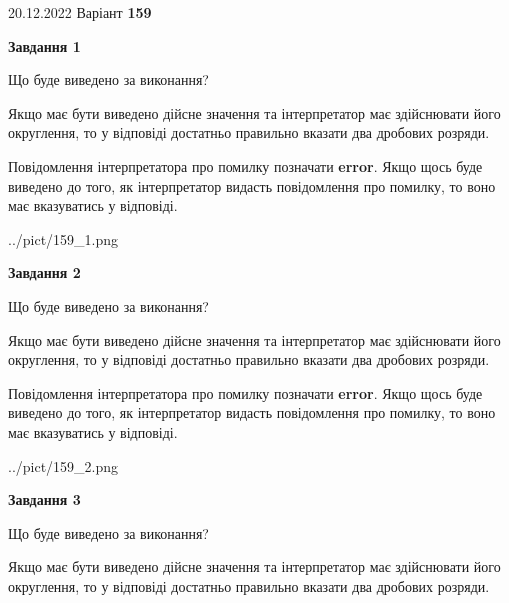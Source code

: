 \documentclass[12pt, ukrainian]{article}
\begin{document}
{20.12.2022 Варіант \No \textbf { 159 }\par}
{
\begin {Large}

{\begin {center}\textbf{Завдання 1}\end {center}}\par
Що буде виведено за виконання? \par

Якщо має бути виведено дійсне значення та інтерпретатор має здійснювати його округлення, 
то у відповіді достатньо правильно вказати два дробових розряди.

Повідомлення інтерпретатора про помилку позначати \textbf{error}.
Якщо щось буде виведено до того, як інтерпретатор видасть повідомлення про помилку, 
то воно має вказуватись у відповіді. \par

\begin{center}
	{../pict/159_1.png}
\end{center}
\newpage

{\begin {center}\textbf{Завдання 2}\end {center}}\par
Що буде виведено за виконання? \par

Якщо має бути виведено дійсне значення та інтерпретатор має здійснювати його округлення, 
то у відповіді достатньо правильно вказати два дробових розряди.

Повідомлення інтерпретатора про помилку позначати \textbf{error}.
Якщо щось буде виведено до того, як інтерпретатор видасть повідомлення про помилку, 
то воно має вказуватись у відповіді. \par

\begin{center}
	{../pict/159_2.png}
\end{center}
\newpage

{\begin {center}\textbf{Завдання 3}\end {center}}\par
Що буде виведено за виконання? \par

Якщо має бути виведено дійсне значення та інтерпретатор має здійснювати його округлення, 
то у відповіді достатньо правильно вказати два дробових розряди.


\end{Large}}
\end{document}
